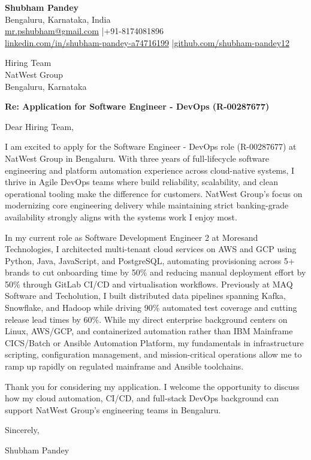 \documentclass[a4paper,11pt]{article}
\begin{document}
\textbf{Shubham Pandey} \\
Bengaluru, Karnataka, India \\
\href{mailto:mr.pshubham@gmail.com}{mr.pshubham@gmail.com} \quad|\quad +91-8174081896 \\
\href{https://www.linkedin.com/in/shubham-pandey-a74716199/}{linkedin.com/in/shubham-pandey-a74716199} \quad|\quad \href{https://github.com/shubham-pandey12}{github.com/shubham-pandey12}

\vspace{1em}

Hiring Team \\
NatWest Group \\
Bengaluru, Karnataka

\vspace{1em}

\textbf{Re: Application for Software Engineer - DevOps (R-00287677)}

Dear Hiring Team,

I am excited to apply for the Software Engineer - DevOps role (R-00287677) at NatWest Group in Bengaluru. With three years of full-lifecycle software engineering and platform automation experience across cloud-native systems, I thrive in Agile DevOps teams where build reliability, scalability, and clean operational tooling make the difference for customers. NatWest Group's focus on modernizing core engineering delivery while maintaining strict banking-grade availability strongly aligns with the systems work I enjoy most.

In my current role as Software Development Engineer 2 at Moresand Technologies, I architected multi-tenant cloud services on AWS and GCP using Python, Java, JavaScript, and PostgreSQL, automating provisioning across 5+ brands to cut onboarding time by 50\% and reducing manual deployment effort by 50\% through GitLab CI/CD and virtualisation workflows. Previously at MAQ Software and Techolution, I built distributed data pipelines spanning Kafka, Snowflake, and Hadoop while driving 90\% automated test coverage and cutting release lead times by 60\%. While my direct enterprise background centers on Linux, AWS/GCP, and containerized automation rather than IBM Mainframe CICS/Batch or Ansible Automation Platform, my fundamentals in infrastructure scripting, configuration management, and mission-critical operations allow me to ramp up rapidly on regulated mainframe and Ansible toolchains.

Thank you for considering my application. I welcome the opportunity to discuss how my cloud automation, CI/CD, and full-stack DevOps background can support NatWest Group's engineering teams in Bengaluru.

\vspace{1em}

Sincerely,

Shubham Pandey
\end{document}
